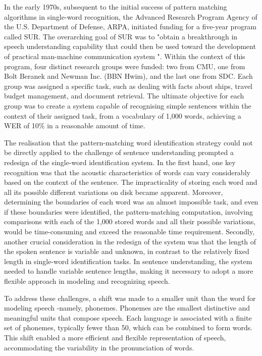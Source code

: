 In the early 1970s, subsequent to the initial success of pattern matching algorithms in single-word recognition, the Advanced Research Program Agency of the U.S. Department of Defense, ARPA, initiated funding for a five-year program called \ac{SUR}. The overarching goal of SUR was to "obtain a breakthrough in speech understanding capability that could then be used toward the development of practical man-machine communication system ". Within the context of this program, four distinct research groups were funded: two from \ac{CMU}, one from Bolt Beranek and Newman Inc. (BBN Hwim), and the last one from \ac{SDC}. Each group was assigned a specific task, such as dealing with facts about ships, travel budget management, and document retrieval. The ultimate objective for each group was to create a system capable of recognising simple sentences within the context of their assigned task, from a vocabulary of 1,000 words, achieving a \ac{WER} of 10\% in a reasonable amount of time.


The realisation that the pattern-matching word identification strategy could not be directly applied to the challenge of sentence understanding prompted a redesign of the single-word identification system. In the first hand, one key recognition was that the acoustic characteristics of words can vary considerably based on the context of the sentence. The impracticality of storing each word and all its possible different variations on disk became apparent. Moreover, determining the boundaries of each word  was an almost impossible task, and even if these boundaries were identified, the pattern-matching computation, involving comparisons with each of the 1,000 stored words and all their possible variations, would be time-consuming and exceed the reasonable time requirement. Secondly, another crucial consideration in the redesign of the system was that the length of the spoken sentence is variable and unknown, in contrast to the relatively fixed length in single-word identification tasks. In sentence understanding, the system needed to handle variable sentence lengths, making it necessary to adopt a more flexible approach in modeling and recognizing speech.

To address these challenges, a shift was made to a smaller unit than the word for modeling speech -namely, phonemes. Phonemes are the smallest distinctive and meaningful units that compose speech. Each language is associated with a finite set of phonemes, typically fewer than 50, which can be combined to form words. This shift enabled a more efficient and flexible representation of speech, accommodating the variability in the pronunciation of words.

